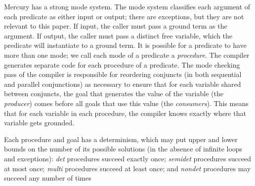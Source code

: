 
Mercury  has a strong mode system.
The mode system classifies each argument of each predicate
as either input or output;
there are exceptions, but they are not relevant to this paper.
If input, the caller must pass a ground term as the argument.
If output, the caller must pass a distinct free variable,
which the predicate will instantiate to a ground term.
It is possible for a predicate to have more than one mode;
we call each mode of a predicate a \emph{procedure}.
The  compiler generates separate code
for each procedure of a predicate.
The mode checking pass of the compiler is responsible for
reordering conjuncts (in both sequential and parallel conjunctions)
as necessary to ensure that for each variable shared between conjuncts,
the goal that generates the value of the variable (the \emph{producer})
comes before all goals that use this value (the \emph{consumers}).
This means that for each variable in each procedure,
the compiler knows exactly where that variable gets grounded.

Each procedure and goal has a determinism,
which may put upper and lower bounds on the number of its possible solutions
(in the absence of infinite loops and exceptions):
\emph{det} procedures succeed exactly once;
\emph{semidet} procedures succeed at most once;
\emph{multi} procedures succeed at least once; and
\emph{nondet} procedures may succeed any number of times

